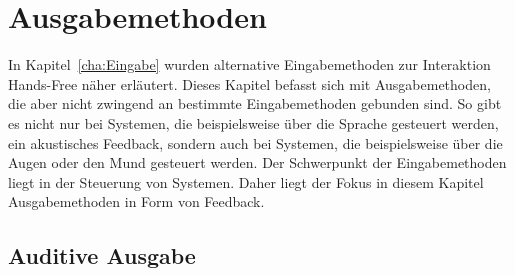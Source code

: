 \chapter{Ausgabemethoden}
\label{cha:Ausgabe}

In Kapitel~\ref{cha:Eingabe} wurden alternative Eingabemethoden zur Interaktion Hands-Free näher erläutert. Dieses Kapitel befasst sich mit Ausgabemethoden, die aber nicht zwingend an bestimmte Eingabemethoden gebunden sind. So gibt es nicht nur bei Systemen, die beispielsweise über die Sprache gesteuert werden, ein akustisches Feedback, sondern auch bei Systemen, die beispielsweise über die Augen oder den Mund gesteuert werden. Der Schwerpunkt der Eingabemethoden liegt in der Steuerung von Systemen. Daher liegt der Fokus in diesem Kapitel Ausgabemethoden in Form von Feedback.


\section{Auditive Ausgabe}

